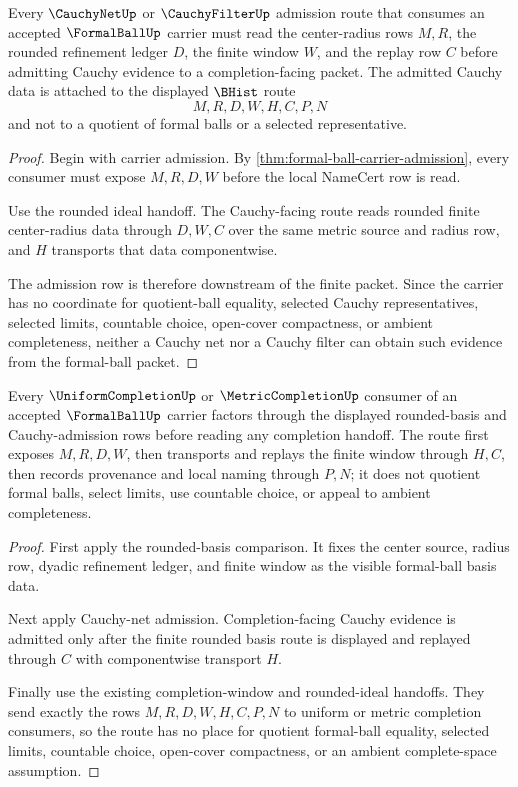 \begin{theorem}
\label{thm:formalball-cauchy-net-admission}
Every $\CauchyNetUp$ or $\CauchyFilterUp$ admission route that consumes an accepted $\FormalBallUp$ carrier must read the center-radius rows $M,R$, the rounded refinement ledger $D$, the finite window $W$, and the replay row $C$ before admitting Cauchy evidence to a completion-facing packet. The admitted Cauchy data is attached to the displayed $\BHist$ route
$$
M,R,D,W,H,C,P,N
$$
and not to a quotient of formal balls or a selected representative.
\end{theorem}
\begin{proof}
Begin with carrier admission. By \autoref{thm:formal-ball-carrier-admission}, every consumer must expose $M,R,D,W$ before the local NameCert row is read.

Use the rounded ideal handoff. The Cauchy-facing route reads rounded finite center-radius data through $D,W,C$ over the same metric source and radius row, and $H$ transports that data componentwise.

The admission row is therefore downstream of the finite packet. Since the carrier has no coordinate for quotient-ball equality, selected Cauchy representatives, selected limits, countable choice, open-cover compactness, or ambient completeness, neither a Cauchy net nor a Cauchy filter can obtain such evidence from the formal-ball packet.
\end{proof}

\begin{theorem}
\label{thm:formalball-uniform-completion-route}
Every $\UniformCompletionUp$ or $\MetricCompletionUp$ consumer of an accepted $\FormalBallUp$ carrier factors through the displayed rounded-basis and Cauchy-admission rows before reading any completion handoff. The route first exposes $M,R,D,W$, then transports and replays the finite window through $H,C$, then records provenance and local naming through $P,N$; it does not quotient formal balls, select limits, use countable choice, or appeal to ambient completeness.
\end{theorem}
\begin{proof}
First apply the rounded-basis comparison. It fixes the center source, radius row, dyadic refinement ledger, and finite window as the visible formal-ball basis data.

Next apply Cauchy-net admission. Completion-facing Cauchy evidence is admitted only after the finite rounded basis route is displayed and replayed through $C$ with componentwise transport $H$.

Finally use the existing completion-window and rounded-ideal handoffs. They send exactly the rows $M,R,D,W,H,C,P,N$ to uniform or metric completion consumers, so the route has no place for quotient formal-ball equality, selected limits, countable choice, open-cover compactness, or an ambient complete-space assumption.
\end{proof}

